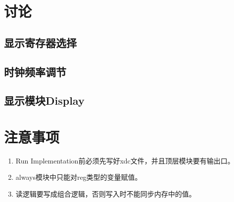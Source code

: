 \documentclass[twocolumn]{article} %
\begin{document}
\begin{sloppypar}
\newpage
\section{讨论}

\subsection{显示寄存器选择}

\subsection{时钟频率调节}

\subsection{显示模块Display}

\section{注意事项}

\begin{enumerate}
\item Run Implementation前必须先写好xdc文件，并且顶层模块要有输出口。
\item always模块中只能对reg类型的变量赋值。
\item 读逻辑要写成组合逻辑，否则写入时不能同步内存中的值。
\end{enumerate}

\end{sloppypar}
\end{document}

